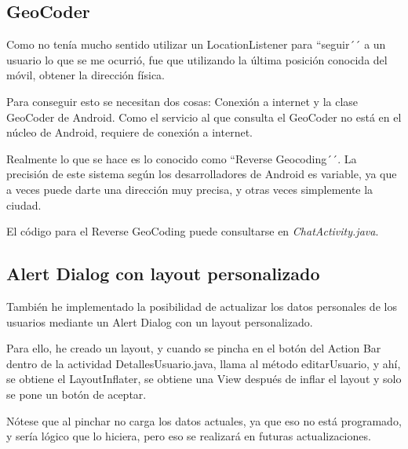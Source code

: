 \documentclass{article}
\begin{document}
\subsection{GeoCoder}
Como no ten\'ia mucho sentido utilizar un LocationListener para ``seguir´´ a un usuario
lo que se me ocurri\'o, fue que utilizando la \'ultima posici\'on conocida del m\'ovil, 
obtener la direcci\'on f\'isica.

Para conseguir esto se necesitan dos cosas: Conexi\'on a internet y la clase GeoCoder de
Android. Como el servicio al que consulta el GeoCoder no est\'a en el n\'ucleo de Android,
requiere de conexi\'on a internet.

Realmente lo que se hace es lo conocido como ``Reverse Geocoding´´. La precisi\'on de
este sistema seg\'un los desarrolladores de Android es variable, ya que a veces puede darte
una direcci\'on muy precisa, y otras veces simplemente la ciudad.

El c\'odigo para el Reverse GeoCoding puede consultarse en \emph{ChatActivity.java}.

\subsection{Alert Dialog con layout personalizado}
Tambi\'en he implementado la posibilidad de actualizar los datos personales de los usuarios
mediante un Alert Dialog con un layout personalizado.

Para ello, he creado un layout, y cuando se pincha en el bot\'on del Action Bar dentro
de la actividad DetallesUsuario.java, llama al m\'etodo editarUsuario, y ah\'i, se obtiene
el LayoutInflater, se obtiene una View despu\'es de inflar el layout y solo se pone un bot\'on
de aceptar.

N\'otese que al pinchar no carga los datos actuales, ya que eso no est\'a programado, y ser\'ia
l\'ogico que lo hiciera, pero eso se realizar\'a en futuras actualizaciones.
\end{document}
